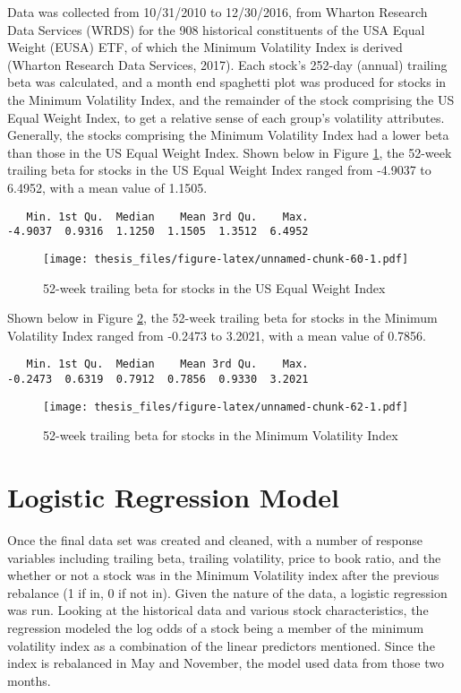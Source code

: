 \documentclass[12pt,twoside]{reedthesis}
\theoremstyle{definition}
\theoremstyle{definition}
\theoremstyle{definition}
\theoremstyle{remark}
\begin{document}
Data was collected from 10/31/2010 to 12/30/2016, from Wharton Research
Data Services (WRDS) for the 908 historical constituents of the USA
Equal Weight (EUSA) ETF, of which the Minimum Volatility Index is
derived (Wharton Research Data Services, 2017). Each stock's 252-day
(annual) trailing beta was calculated, and a month end spaghetti plot
was produced for stocks in the Minimum Volatility Index, and the
remainder of the stock comprising the US Equal Weight Index, to get a
relative sense of each group's volatility attributes. Generally, the
stocks comprising the Minimum Volatility Index had a lower beta than
those in the US Equal Weight Index. Shown below in Figure
\ref{fig:vol3}, the 52-week trailing beta for stocks in the US Equal
Weight Index ranged from -4.9037 to 6.4952, with a mean value of 1.1505.
\begin{verbatim}
   Min. 1st Qu.  Median    Mean 3rd Qu.    Max. 
-4.9037  0.9316  1.1250  1.1505  1.3512  6.4952 
\end{verbatim}
\begin{figure}[htbp]
\centering
\texttt{[image: thesis\_files/figure-latex/unnamed-chunk-60-1.pdf]}
\caption{\label{fig:unnamed-chunk-60}52-week trailing beta for stocks in the
US Equal Weight Index\label{fig:vol3}}
\end{figure}
\clearpage  Shown below in Figure \ref{fig:vol4}, the 52-week trailing
beta for stocks in the Minimum Volatility Index ranged from -0.2473 to
3.2021, with a mean value of 0.7856.
\begin{verbatim}
   Min. 1st Qu.  Median    Mean 3rd Qu.    Max. 
-0.2473  0.6319  0.7912  0.7856  0.9330  3.2021 
\end{verbatim}
\begin{figure}[htbp]
\centering
\texttt{[image: thesis\_files/figure-latex/unnamed-chunk-62-1.pdf]}
\caption{\label{fig:unnamed-chunk-62}52-week trailing beta for stocks in the
Minimum Volatility Index\label{fig:vol4}}
\end{figure}
\chapter{Logistic Regression Model}\label{logistic-regression-model}

Once the final data set was created and cleaned, with a number of
response variables including trailing beta, trailing volatility, price
to book ratio, and the whether or not a stock was in the Minimum
Volatility index after the previous rebalance (1 if in, 0 if not in).
Given the nature of the data, a logistic regression was run. Looking at
the historical data and various stock characteristics, the regression
modeled the log odds of a stock being a member of the minimum volatility
index as a combination of the linear predictors mentioned. Since the
index is rebalanced in May and November, the model used data from those
two months.
\end{document}
